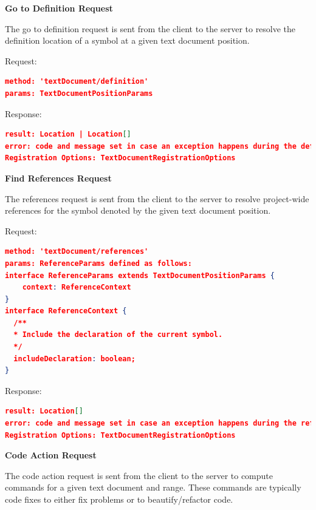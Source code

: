 \textbf{Go to Definition Request}

The go to definition request is sent from the client to the server to resolve the definition location of a symbol at a given text document position.

Request:
\begin{lstlisting}[language=json,firstnumber=1]
method: 'textDocument/definition'
params: TextDocumentPositionParams
\end{lstlisting}

Response:
\begin{lstlisting}[language=json,firstnumber=1]
result: Location | Location[]
error: code and message set in case an exception happens during the definition request.
Registration Options: TextDocumentRegistrationOptions
\end{lstlisting}

\textbf{Find References Request}

The references request is sent from the client to the server to resolve project-wide references for the symbol denoted by the given text document position.

Request:
\begin{lstlisting}[language=json,firstnumber=1]
method: 'textDocument/references'
params: ReferenceParams defined as follows:
interface ReferenceParams extends TextDocumentPositionParams {
	context: ReferenceContext
}
interface ReferenceContext {
  /**
  * Include the declaration of the current symbol.
  */
  includeDeclaration: boolean;
}
\end{lstlisting}
Response:
\begin{lstlisting}[language=json,firstnumber=1]
result: Location[]
error: code and message set in case an exception happens during the reference request.
Registration Options: TextDocumentRegistrationOptions
\end{lstlisting}

\textbf{Code Action Request}

The code action request is sent from the client to the server to compute commands for a given text document and range. These commands are typically code fixes to either fix problems or to beautify/refactor code.

